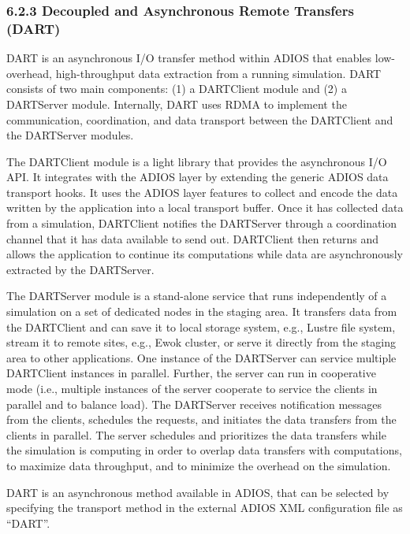 \subsubsection*{{\large {\color{color01} \textbf{6.2.3 Decoupled and Asynchronous 
Remote Transfers}}}{\large \textbf{ (DART)}}}

\vspace{10pt}
DART is an asynchronous I/O transfer method within ADIOS that enables low-overhead, 
high-throughput data extraction from a running simulation. DART consists of two 
main components: (1) a DARTClient module and (2) a DARTServer module. Internally, 
DART uses RDMA to implement the communication, coordination, and data transport 
between the DARTClient and the DARTServer modules.

\vspace{10pt}
The DARTClient module is a light library that provides the asynchronous I/O API. 
It integrates with the ADIOS layer by extending the generic ADIOS data transport 
hooks. It uses the ADIOS layer features to collect and encode the data written 
by the application into a local transport buffer. Once it has collected data from 
a simulation, DARTClient notifies the DARTServer through a coordination channel 
that it has data available to send out. DARTClient then returns and allows the 
application to continue its computations while data are asynchronously extracted 
by the DARTServer.

\vspace{10pt}
The DARTServer module is a stand-alone service that runs independently of a simulation 
on a set of dedicated nodes in the staging area. It transfers data from the DARTClient 
and can save it to local storage system, e.g., Lustre file system, stream it to 
remote sites, e.g., Ewok cluster, or serve it directly from the staging area to 
other applications. One instance of the DARTServer can service multiple DARTClient 
instances in parallel. Further, the server can run in cooperative mode (i.e., multiple 
instances of the server cooperate to service the clients in parallel and to balance 
load). The DARTServer receives notification messages from the clients, schedules 
the requests, and initiates the data transfers from the clients in parallel. The 
server schedules and prioritizes the data transfers while the simulation is computing 
in order to overlap data transfers with computations, to maximize data throughput, 
and to minimize the overhead on the simulation.

\vspace{10pt}
DART is an asynchronous method available in ADIOS, that can be selected by specifying 
the transport method in the external ADIOS XML configuration file as ``DART''.


